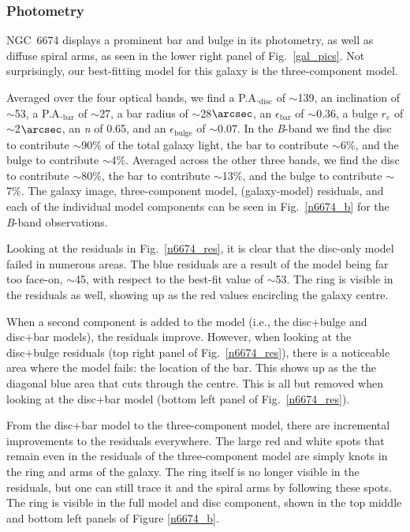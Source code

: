 \documentclass[a4paper,fleqn,usenatbib]{mnras}
\begin{document}
\subsubsection{Photometry}
\label{sec:n6674phot}

NGC~6674 displays a prominent bar and bulge in its photometry, as well as diffuse spiral arms, as seen in the lower right panel of Fig.~\ref{gal_pics}. Not surprisingly, our best-fitting model for this galaxy is the three-component model. 

Averaged over the four optical bands, we find a P.A.$_{\mathrm{disc}}$ of $\sim$139\degr, an inclination of $\sim$53\degr, a P.A.$_{\mathrm{bar}}$ of $\sim$27\degr, a bar radius of $\sim$28$\arcsec$, an $\epsilon_{\mathrm{bar}}$ of $\sim$0.36, a bulge $r_{e}$ of $\sim$2$\arcsec$, an \textit{n} of 0.65, and an $\epsilon_{\mathrm{bulge}}$ of $\sim$0.07. In the \textit{B}-band we find the disc to contribute $\sim$90\% of the total galaxy light, the bar to contribute $\sim$6\%, and the bulge to contribute $\sim$4\%. Averaged across the other three bands, we find the disc to contribute $\sim$80\%, the bar to contribute $\sim$13\%, and the bulge to contribute $\sim$7\%. The galaxy image, three-component model, (galaxy-model) residuals, and each of the individual model components can be seen in Fig.~\ref{n6674_b} for the \textit{B}-band observations.

Looking at the residuals in Fig.~\ref{n6674_res}, it is clear that the disc-only model failed in numerous areas. The blue residuals are a result of the model being far too face-on, $\sim$45\degr, with respect to the best-fit value of $\sim$53\degr. The ring is visible in the residuals as well, showing up as the red values encircling the galaxy centre. 

When a second component is added to the model (i.e., the disc+bulge and disc+bar models), the residuals improve. However, when looking at the disc+bulge residuals (top right panel of Fig.~\ref{n6674_res}), there is a noticeable area where the model fails: the location of the bar. This shows up as the the diagonal blue area that cuts through the centre. This is all but removed when looking at the disc+bar model (bottom left panel of Fig.~\ref{n6674_res}). 

From the disc+bar model to the three-component model, there are incremental improvements to the residuals everywhere. The large red and white spots that remain even in the residuals of the three-component model are simply knots in the ring and arms of the galaxy. The ring itself is no longer visible in the residuals, but one can still trace it and the spiral arms by following these spots. The ring is visible in the full model and disc component, shown in the top middle and bottom left panels of Figure \ref{n6674_b}.
\end{document}
